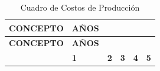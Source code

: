 \documentclass[
  stu,
  floatsintext,
  longtable,
  a4paper,
  nolmodern,
  notxfonts,
  notimes,
  12pt,
  colorlinks=true,linkcolor=blue,citecolor=blue,urlcolor=blue]{apa7}
\begin{document}
\begin{longtable}[]{@{}
  >{\raggedright\arraybackslash}p{}
  >{\centering\arraybackslash}p{}
  >{\centering\arraybackslash}p{}
  >{\centering\arraybackslash}p{}
  >{\centering\arraybackslash}p{}
  >{\centering\arraybackslash}p{}@{}}
\caption{Cuadro de Costos de Producción}\tabularnewline
\toprule\noalign{}
\begin{minipage}[b]{\linewidth}\raggedright
\textbf{CONCEPTO}
\end{minipage} & \begin{minipage}[b]{\linewidth}\centering
\textbf{AÑOS}
\end{minipage} & \begin{minipage}[b]{\linewidth}\centering
\end{minipage} & \begin{minipage}[b]{\linewidth}\centering
\end{minipage} & \begin{minipage}[b]{\linewidth}\centering
\end{minipage} & \begin{minipage}[b]{\linewidth}\centering
\end{minipage} \\
\midrule\noalign{}
\endfirsthead
\toprule\noalign{}
\begin{minipage}[b]{\linewidth}\raggedright
\textbf{CONCEPTO}
\end{minipage} & \begin{minipage}[b]{\linewidth}\centering
\textbf{AÑOS}
\end{minipage} & \begin{minipage}[b]{\linewidth}\centering
\end{minipage} & \begin{minipage}[b]{\linewidth}\centering
\end{minipage} & \begin{minipage}[b]{\linewidth}\centering
\end{minipage} & \begin{minipage}[b]{\linewidth}\centering
\end{minipage} \\
\midrule\noalign{}
\endhead
\bottomrule\noalign{}
\endlastfoot
& \textbf{1} & \textbf{2} & \textbf{3} & \textbf{4} & \textbf{5} \\

\end{longtable}
\end{document}
